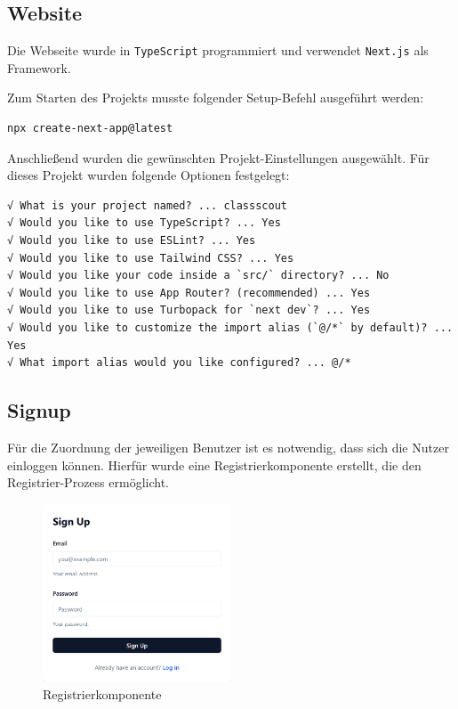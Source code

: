 \begin{inhalt}
\renewcommand*\chapterpagestyle{scrheadings}
\chapter{Website}
\label{ref:Website}

Die Webseite wurde in \texttt{TypeScript} programmiert und verwendet \texttt{Next.js} als Framework.

\vspace{0.15cm}

Zum Starten des Projekts musste folgender Setup-Befehl ausgeführt werden:

\begin{lstlisting}[style=myconsole]
npx create-next-app@latest
\end{lstlisting}

Anschließend wurden die gewünschten Projekt-Einstellungen ausgewählt.  
Für dieses Projekt wurden folgende Optionen festgelegt:

\begin{lstlisting}[style=myconsole]
√ What is your project named? ... classscout
√ Would you like to use TypeScript? ... Yes
√ Would you like to use ESLint? ... Yes
√ Would you like to use Tailwind CSS? ... Yes
√ Would you like your code inside a `src/` directory? ... No
√ Would you like to use App Router? (recommended) ... Yes
√ Would you like to use Turbopack for `next dev`? ... Yes
√ Would you like to customize the import alias (`@/*` by default)? ... Yes
√ What import alias would you like configured? ... @/*
\end{lstlisting}



\newpage

\section{Signup}
\label{ref:Signup}
Für die Zuordnung der jeweiligen Benutzer ist es notwendig, dass sich die Nutzer einloggen können.  
Hierfür wurde eine Registrierkomponente erstellt, die den Registrier-Prozess ermöglicht.


\begin{figure}[!htb]
\centering
\includegraphics[width=0.5\textwidth]{files/Thomas/pics/Website/Signup/sign-up.png}
\caption[Registrierkomponente]{Registrierkomponente}
\label{fig:gehaeuse_internet_bild}
\end{figure}


\end{inhalt}
